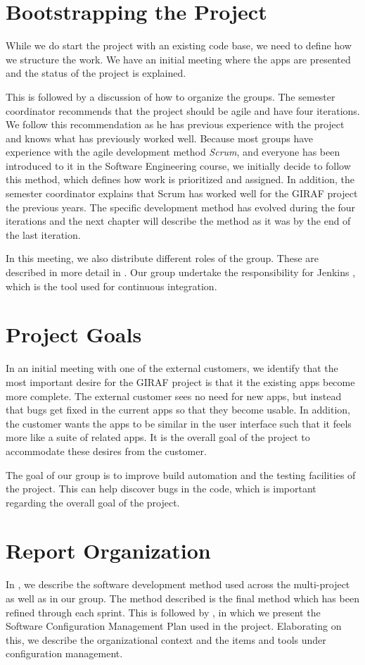 \section{Bootstrapping the Project}
While we do start the project with an existing code base, we need to define how we structure the work. We have an initial meeting where the apps are presented and the status of the project is explained.

This is followed by a discussion of how to organize the groups. The semester coordinator recommends that the project should be agile and have four iterations. We follow this recommendation as he has previous experience with the project and knows what has previously worked well. Because most groups have experience with the agile development method \emph{Scrum}, and everyone has been introduced to it in the Software Engineering course, we initially decide to follow this method, which defines how work is prioritized and assigned. In addition, the semester coordinator explains that Scrum has worked well for the GIRAF project the previous years. The specific development method has evolved during the four iterations and the next chapter will describe the method as it was by the end of the last iteration.

In this meeting, we also distribute different roles of the group. These are described in more detail in . Our group undertake the responsibility for Jenkins \cite{JenkinsWebsite}, which is the tool used for continuous integration.

\section{Project Goals}
In an initial meeting with one of the external customers, we identify that the most important desire for the GIRAF project is that it the existing apps become more complete. The external customer sees no need for new apps, but instead that bugs get fixed in the current apps so that they become usable. In addition, the customer wants the apps to be similar in the user interface such that it feels more like a suite of related apps. It is the overall goal of the project to accommodate these desires from the customer.

The goal of our group is to improve build automation and the testing facilities of the project. This can help discover bugs in the code, which is important regarding the overall goal of the project.

\section{Report Organization}
In , we describe the software development method used across the multi-project as well as in our group. The method described is the final method which has been refined through each sprint. This is followed by , in which we present the Software Configuration Management Plan used in the project. Elaborating on this, we describe the organizational context and the items and tools under configuration management.

